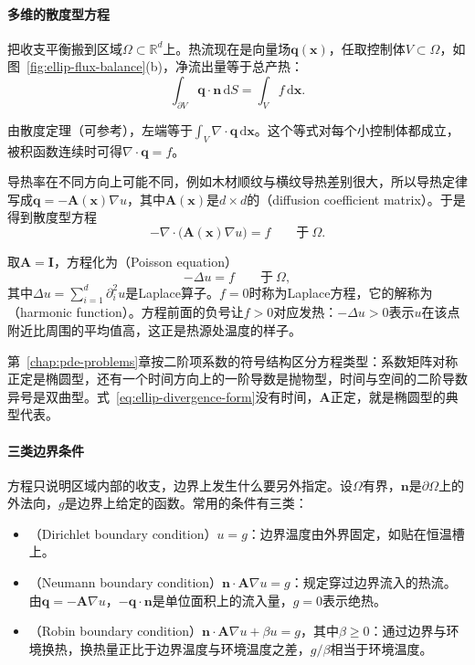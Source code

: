 \paragraph{多维的散度型方程}
把收支平衡搬到区域$\Omega\subset\mathbb{R}^{d}$上。热流现在是向量场$\bm{q}(\bm{x})$，任取控制体$V\subset\Omega$，如图~\ref{fig:ellip-flux-balance}(b)，净流出量等于总产热：
\[
 \int_{\partial V}\bm{q}\cdot\bm{n}\,\mathrm{d}S=\int_Vf\,\mathrm{d}\bm{x} .
\]

由散度定理（可参考），左端等于$\int_V\nabla\cdot\bm{q}\,\mathrm{d}\bm{x}$。这个等式对每个小控制体都成立，被积函数连续时可得$\nabla\cdot\bm{q}=f$。

导热率在不同方向上可能不同，例如木材顺纹与横纹导热差别很大，所以导热定律写成$\bm{q}=-\bm{A}(\bm{x})\nabla u$，其中$\bm{A}(\bm{x})$是$d\times d$的（diffusion coefficient matrix）。于是得到散度型方程
\begin{equation}
 -\nabla\cdot\bigl(\bm{A}(\bm{x})\nabla u\bigr)=f\qquad\text{于}\ \Omega.
 \label{eq:ellip-divergence-form}
\end{equation}

取$\bm{A}=\bm{I}$，方程化为（Poisson equation）
\begin{equation}
 -\Delta u=f\qquad\text{于}\ \Omega,
 \label{eq:ellip-poisson}
\end{equation}
其中$\Delta u=\sum_{i=1}^d\partial_{i}^2u$是Laplace算子。$f=0$时称为Laplace方程，它的解称为（harmonic function）。方程前面的负号让$f>0$对应发热：$-\Delta u>0$表示$u$在该点附近比周围的平均值高，这正是热源处温度的样子。

第~\ref{chap:pde-problems}章按二阶项系数的符号结构区分方程类型：系数矩阵对称正定是椭圆型，还有一个时间方向上的一阶导数是抛物型，时间与空间的二阶导数异号是双曲型。式~\eqref{eq:ellip-divergence-form}没有时间，$\bm{A}$正定，就是椭圆型的典型代表。

\paragraph{三类边界条件}
方程只说明区域内部的收支，边界上发生什么要另外指定。设$\Omega$有界，$\bm{n}$是$\partial\Omega$上的外法向，$g$是边界上给定的函数。常用的条件有三类：

\begin{itemize}
 \item {}（Dirichlet boundary condition）$u=g$：边界温度由外界固定，如贴在恒温槽上。
 \item {}（Neumann boundary condition）$\bm{n}\cdot\bm{A}\nabla u=g$：规定穿过边界流入的热流。由$\bm{q}=-\bm{A}\nabla u$，$-\bm{q}\cdot\bm{n}$是单位面积上的流入量，$g=0$表示绝热。
 \item {}（Robin boundary condition）$\bm{n}\cdot\bm{A}\nabla u+\beta u=g$，其中$\beta\geq0$：通过边界与环境换热，换热量正比于边界温度与环境温度之差，$g/\beta$相当于环境温度。
\end{itemize}

